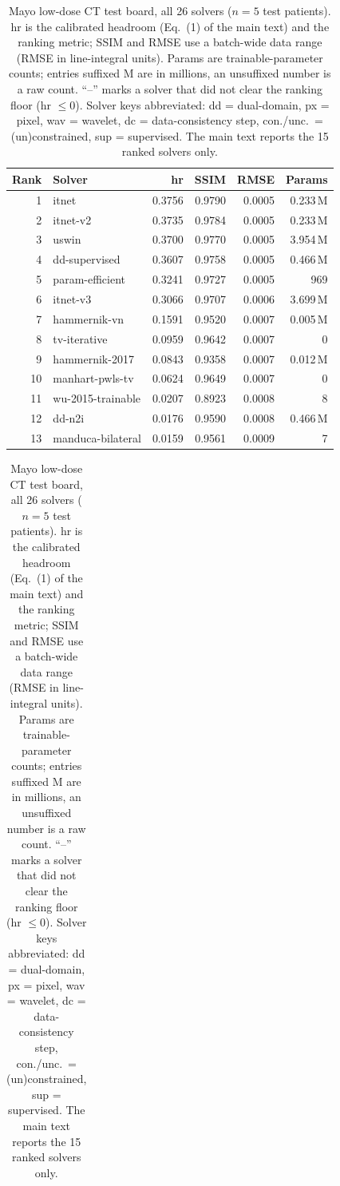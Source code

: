 \documentclass[AMA,twocolumn]{USG}
\begin{document}
\begin{table}[tb]
\caption{Mayo low-dose CT test board, all 26 solvers ($n=5$ test patients). hr is the calibrated headroom (Eq.~(1) of the main text) and the ranking metric; SSIM and RMSE use a batch-wide data range (RMSE in line-integral units). Params are trainable-parameter counts; entries suffixed M are in millions, an unsuffixed number is a raw count. ``--'' marks a solver that did not clear the ranking floor (hr $\le 0$). Solver keys abbreviated: dd = dual-domain, px = pixel, wav = wavelet, dc = data-consistency step, con./unc.\ = (un)constrained, sup = supervised. The main text reports the 15 ranked solvers only.\label{tab:mayofull}}
\scriptsize
\setlength{\tabcolsep}{3pt}
\begin{minipage}[t]{0.49\textwidth}
\centering
\begin{tabular}{@{}rlrrrr@{}}
\toprule
\textbf{Rank} & \textbf{Solver} & \textbf{hr} & \textbf{SSIM} & \textbf{RMSE} & \textbf{Params} \\
\midrule
1  & itnet             & 0.3756 & 0.9790 & 0.0005 & 0.233\,M \\
2  & itnet-v2          & 0.3735 & 0.9784 & 0.0005 & 0.233\,M \\
3  & uswin             & 0.3700 & 0.9770 & 0.0005 & 3.954\,M \\
4  & dd-supervised     & 0.3607 & 0.9758 & 0.0005 & 0.466\,M \\
5  & param-efficient   & 0.3241 & 0.9727 & 0.0005 & 969 \\
6  & itnet-v3          & 0.3066 & 0.9707 & 0.0006 & 3.699\,M \\
7  & hammernik-vn      & 0.1591 & 0.9520 & 0.0007 & 0.005\,M \\
8  & tv-iterative      & 0.0959 & 0.9642 & 0.0007 & 0 \\
9  & hammernik-2017    & 0.0843 & 0.9358 & 0.0007 & 0.012\,M \\
10 & manhart-pwls-tv   & 0.0624 & 0.9649 & 0.0007 & 0 \\
11 & wu-2015-trainable & 0.0207 & 0.8923 & 0.0008 & 8 \\
12 & dd-n2i            & 0.0176 & 0.9590 & 0.0008 & 0.466\,M \\
13 & manduca-bilateral & 0.0159 & 0.9561 & 0.0009 & 7 \\
\bottomrule
\end{tabular}
\end{minipage}\hfill
\begin{minipage}[t]{0.49\textwidth}
\centering
\begin{tabular}{@{}rlrrrr@{}}

\end{tabular}
\end{minipage}
\end{table}
\end{document}
